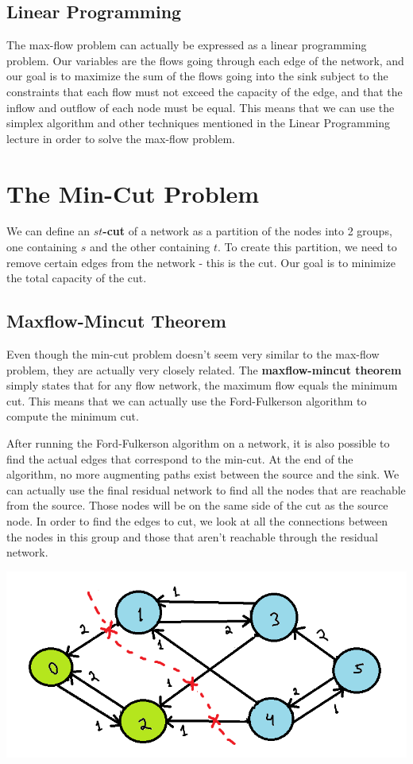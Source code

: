 \documentclass[12pt, letterpaper]{article}
\begin{document}
\subsection{Linear Programming}
The max-flow problem can actually be expressed as a linear programming problem. Our variables are the flows going through each edge of the network, and our goal is to maximize the sum of the flows going into the sink subject to the constraints that each flow must not exceed the capacity of the edge, and that the inflow and outflow of each node must be equal. This means that we can use the simplex algorithm and other techniques mentioned in the Linear Programming lecture in order to solve the max-flow problem.

\newpage
\section{The Min-Cut Problem}
We can define an \textbf{$st$-cut} of a network as a partition of the nodes into 2 groups, one containing $s$ and the other containing $t$. To create this partition, we need to remove certain edges from the network - this is the cut. Our goal is to minimize the total capacity of the cut.

\subsection{Maxflow-Mincut Theorem}
Even though the min-cut problem doesn't seem very similar to the max-flow problem, they are actually very closely related. The \textbf{maxflow-mincut theorem} simply states that for any flow network, the maximum flow equals the minimum cut. This means that we can actually use the Ford-Fulkerson algorithm to compute the minimum cut.

After running the Ford-Fulkerson algorithm on a network, it is also possible to find the actual edges that correspond to the min-cut. At the end of the algorithm, no more augmenting paths exist between the source and the sink. We can actually use the final residual network to find all the nodes that are reachable from the source. Those nodes will be on the same side of the cut as the source node. In order to find the edges to cut, we look at all the connections between the nodes in this group and those that aren't reachable through the residual network.

\includegraphics[scale=0.75]{figure6.png}
\end{document}
